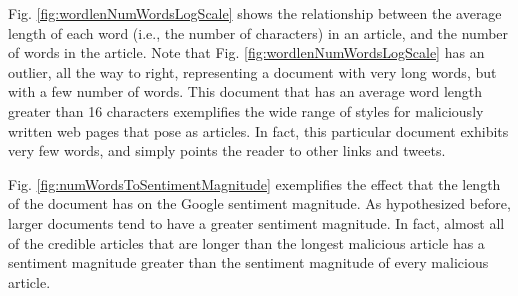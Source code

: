 Fig. \ref{fig:wordlenNumWordsLogScale} shows the relationship between the average length of each word (i.e., the number of characters) in an article, and the number of words in the article.  Note that Fig. \ref{fig:wordlenNumWordsLogScale} has an outlier, all the way to right, representing a document with very long words, but with a few number of words.  This document that has an average word length greater than 16 characters exemplifies the wide range of styles for maliciously written web pages that pose as articles.  In fact, this particular document exhibits very few words, and simply points the reader to other links and tweets.

Fig. \ref{fig:numWordsToSentimentMagnitude} exemplifies the effect that the length of the document has on the Google sentiment magnitude.  As hypothesized before, larger documents tend to have a greater sentiment magnitude.  In fact, almost all of the credible articles that are longer than the longest malicious article has a sentiment magnitude greater than the sentiment magnitude of every malicious article.


